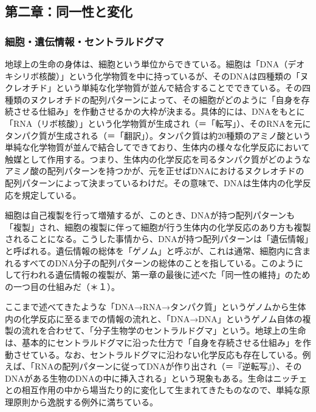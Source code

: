 \subsection{第二章：同一性と変化}\label{ux7b2cux4e8cux7ae0ux540cux4e00ux6027ux3068ux5909ux5316}

\subsubsection{細胞・遺伝情報・セントラルドグマ}\label{ux7d30ux80deux907aux4f1dux60c5ux5831ux30bbux30f3ux30c8ux30e9ux30ebux30c9ux30b0ux30de}

地球上の生命の身体は、細胞という単位からできている。細胞は「DNA（デオキシリボ核酸）」という化学物質を中に持っているが、そのDNAは四種類の「ヌクレオチド」という単純な化学物質が並んで結合することでできている。その四種類のヌクレオチドの配列パターンによって、その細胞がどのように「自身を存続させる仕組み」を作動させるかの大枠が決まる。具体的には、DNAをもとに「RNA（リボ核酸）」という化学物質が生成され（＝「転写」）、そのRNAを元にタンパク質が生成される（＝「翻訳」）。タンパク質は約20種類のアミノ酸という単純な化学物質が並んで結合してできており、生体内の様々な化学反応において触媒として作用する。つまり、生体内の化学反応を司るタンパク質がどのようなアミノ酸の配列パターンを持つかが、元を正せばDNAにおけるヌクレオチドの配列パターンによって決まっているわけだ。その意味で、DNAは生体内の化学反応を規定している。

細胞は自己複製を行って増殖するが、このとき、DNAが持つ配列パターンも「複製」され、細胞の複製に伴って細胞が行う生体内の化学反応のあり方も複製されることになる。こうした事情から、DNAが持つ配列パターンは「遺伝情報」と呼ばれる。遺伝情報の総体を「ゲノム」と呼ぶが、これは通常、細胞内に含まれるすべてのDNA分子の配列パターンの総体のことを指している。このようにして行われる遺伝情報の複製が、第一章の最後に述べた「同一性の維持」のための一つ目の仕組みだ（＊１）。

ここまで述べてきたような「DNA→RNA→タンパク質」というゲノムから生体内の化学反応に至るまでの情報の流れと、「DNA→DNA」というゲノム自体の複製の流れを合わせて、「分子生物学のセントラルドグマ」という。地球上の生命は、基本的にセントラルドグマに沿った仕方で「自身を存続させる仕組み」を作動させている。なお、セントラルドグマに沿わない化学反応も存在している。例えば、「RNAの配列パターンに従ってDNAが作り出され（＝『逆転写』）、そのDNAがある生物のDNAの中に挿入される」という現象もある。生命はニッチェとの相互作用の中から場当たり的に変化して生まれてきたものなので、単純な原理原則から逸脱する例外に満ちている。

